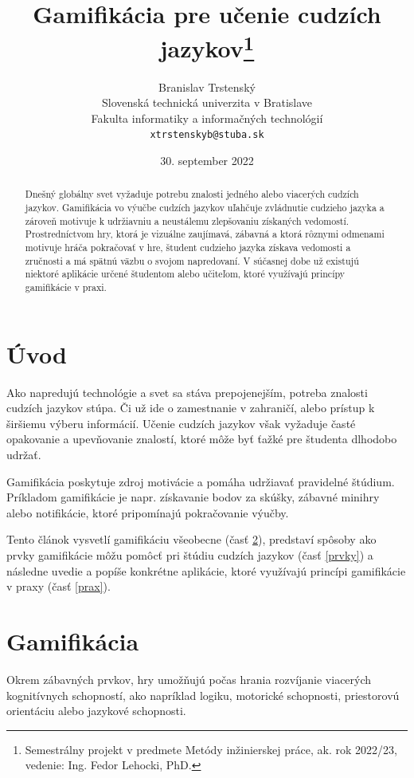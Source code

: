 \documentclass[10pt,twoside,slovak,a4paper]{article}
\title{Gamifikácia pre učenie cudzích jazykov\thanks{Semestrálny projekt v predmete Metódy inžinierskej práce, ak. rok 2022/23, vedenie: Ing. Fedor Lehocki, PhD.}} %
\author{Branislav Trstenský\\[2pt]
	{\small Slovenská technická univerzita v Bratislave}\\
	{\small Fakulta informatiky a informačných technológií}\\
	{\small \texttt{xtrstenskyb@stuba.sk}}
	}
\date{\small 30. september 2022} %
\begin{document}
\maketitle

\begin{abstract}

Dnešný globálny svet vyžaduje potrebu znalosti jedného alebo viacerých cudzích jazykov. Gamifikácia vo výučbe cudzích jazykov uľahčuje zvládnutie cudzieho jazyka a zároveň  motivuje k udržiavniu a neustálemu zlepšovaniu získaných vedomostí.
Prostredníctvom hry, ktorá je vizuálne zaujímavá, zábavná a ktorá rôznymi odmenami motivuje hráča pokračovať v hre, študent cudzieho jazyka získava vedomosti a zručnosti a má spätnú väzbu o svojom napredovaní.
V súčasnej dobe už existujú niektoré aplikácie určené študentom alebo učiteľom, ktoré využívajú princípy gamifikácie v praxi.

\end{abstract}


\section{Úvod}

Ako napredujú technológie a svet sa stáva prepojenejším, potreba znalosti cudzích jazykov stúpa. Či už ide o zamestnanie v zahraničí, alebo prístup k širšiemu výberu informácií. Učenie cudzích jazykov však vyžaduje časté opakovanie a upevňovanie znalostí, ktoré môže byť ťažké pre študenta dlhodobo udržať. 

Gamifikácia poskytuje zdroj motivácie a pomáha udržiavať pravidelné štúdium. Príkladom gamifikácie je napr. získavanie bodov za skúšky, zábavné minihry alebo notifikácie, ktoré pripomínajú pokračovanie výučby.

Tento článok vysvetlí gamifikáciu všeobecne (časť \ref{gamifikacia}), predstaví spôsoby ako prvky gamifikácie môžu pomôcť pri štúdiu cudzích jazykov (časť \ref{prvky}) a následne uvedie a popíše konkrétne aplikácie, ktoré využívajú princípi gamifikácie v praxy (časť \ref{prax}).

\section{Gamifikácia} \label{gamifikacia}

Okrem zábavných prvkov, hry umožňujú počas hrania rozvíjanie viacerých kognitívnych schopností, ako napríklad logiku, motorické schopnosti, priestorovú orientáciu alebo jazykové schopnosti. 
\end{document}
